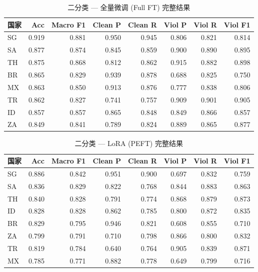 \documentclass[11pt,a4paper]{article}
\begin{document}
\begin{table}[h]\centering
\caption{二分类 — 全量微调 (Full FT) 完整结果}\label{tab:bin-ft}
\small
\begin{tabular}{@{}lrrrrrrr@{}}
\toprule
\textbf{国家} & \textbf{Acc} & \textbf{Macro F1} & \textbf{Clean P} & \textbf{Clean R} & \textbf{Viol P} & \textbf{Viol R} & \textbf{Viol F1} \\
\midrule
SG & 0.919 & 0.881 & 0.950 & 0.945 & 0.806 & 0.821 & 0.814 \\
SA & 0.877 & 0.874 & 0.845 & 0.859 & 0.900 & 0.890 & 0.895 \\
TH & 0.875 & 0.868 & 0.812 & 0.862 & 0.915 & 0.882 & 0.898 \\
BR & 0.865 & 0.829 & 0.939 & 0.878 & 0.688 & 0.825 & 0.750 \\
MX & 0.863 & 0.850 & 0.913 & 0.876 & 0.777 & 0.838 & 0.806 \\
TR & 0.862 & 0.827 & 0.741 & 0.757 & 0.909 & 0.901 & 0.905 \\
ID & 0.857 & 0.857 & 0.865 & 0.848 & 0.849 & 0.866 & 0.857 \\
ZA & 0.849 & 0.841 & 0.789 & 0.824 & 0.889 & 0.865 & 0.877 \\
\bottomrule
\end{tabular}
\end{table}

\begin{table}[h]\centering
\caption{二分类 — LoRA (PEFT) 完整结果}\label{tab:bin-lora}
\small
\begin{tabular}{@{}lrrrrrrr@{}}
\toprule
\textbf{国家} & \textbf{Acc} & \textbf{Macro F1} & \textbf{Clean P} & \textbf{Clean R} & \textbf{Viol P} & \textbf{Viol R} & \textbf{Viol F1} \\
\midrule
SG & 0.886 & 0.842 & 0.951 & 0.900 & 0.697 & 0.832 & 0.759 \\
SA & 0.836 & 0.829 & 0.822 & 0.768 & 0.844 & 0.883 & 0.863 \\
TH & 0.840 & 0.828 & 0.791 & 0.774 & 0.868 & 0.879 & 0.873 \\
ID & 0.828 & 0.828 & 0.862 & 0.785 & 0.800 & 0.872 & 0.835 \\
BR & 0.829 & 0.795 & 0.946 & 0.821 & 0.608 & 0.855 & 0.710 \\
ZA & 0.799 & 0.791 & 0.710 & 0.798 & 0.866 & 0.800 & 0.832 \\
TR & 0.819 & 0.784 & 0.640 & 0.764 & 0.905 & 0.839 & 0.871 \\
MX & 0.785 & 0.771 & 0.882 & 0.778 & 0.649 & 0.799 & 0.716 \\
\bottomrule
\end{tabular}
\end{table}
\end{document}
